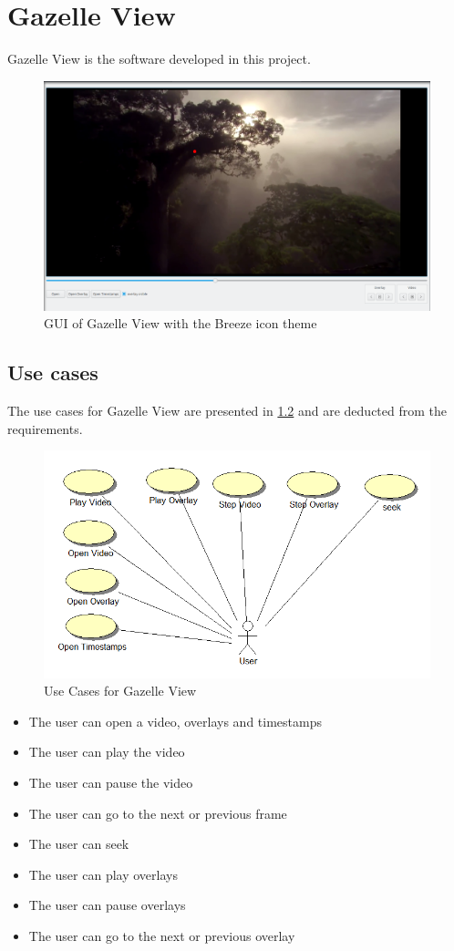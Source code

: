 \chapter{Gazelle View}
\label{chap:gazelleView}
 Gazelle View is the software developed in this project. 
 \begin{figure}[H]
 	\centering
 	\includegraphics[scale=0.25]{images/gui_gazelle_view.png}
 	\caption{\gls{GUI} of Gazelle View with the Breeze icon theme}
 	\label{fig:guiGazelleView}
 \end{figure}
\section{Use cases}
\label{sec:useCases}
The use cases for Gazelle View are presented in \ref{fig:useCases} and are deducted from the requirements.
\begin{figure}[H]
 	\centering
 	\includegraphics[scale=0.7]{images/useCaseDiagram.png}
 	\caption{Use Cases for Gazelle View}
	\label{fig:useCases}
\end{figure}
\begin{itemize}
	\item The user can open a video, overlays and timestamps
	\item The user can play the video
	\item The user can pause the video
	\item The user can go to the next or previous frame
	\item The user can seek
	\item The user can play overlays
	\item The user can pause overlays
	\item The user can go to the next or previous overlay
\end{itemize}
